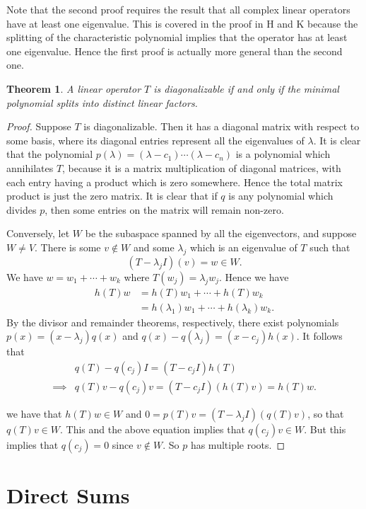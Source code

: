 \documentclass[12pt]{article}
\theoremstyle{plain}
\newtheorem{thm}{Theorem}
\theoremstyle{definition}
\begin{document}
Note that the second proof requires the result that all complex linear operators have at least one eigenvalue. This is covered in the proof in H and K because the splitting of the characteristic polynomial implies that the operator has at least one eigenvalue. Hence the first proof is actually more general than the second one.

\begin{thm}
A linear operator $T$ is diagonalizable if and only if the minimal polynomial splits into distinct linear factors.
\end{thm}
\begin{proof}
Suppose $T$ is diagonalizable. Then it has a diagonal matrix with respect to some basis, where its diagonal entries represent all the eigenvalues of $\lambda$. It is clear that the polynomial $p(\lambda) = (\lambda - c_1)\cdots(\lambda - c_n)$ is a polynomial which annihilates $T$, because it is a matrix multiplication of diagonal matrices, with each entry having a product which is zero somewhere. Hence the total matrix product is just the zero matrix. It is clear that if $q$ is any polynomial which divides $p$, then some entries on the matrix will remain non-zero.

Conversely, let $W$ be the subaspace spanned by all the eigenvectors, and suppose $W \neq V$. There is some $v \not\in W$ and some $\lambda_j$ which is an eigenvalue of $T$ such that 
\[(T - \lambda_j I)(v) = w \in W.\]
We have $w = w_1 + \cdots + w_k$ where $T(w_j) = \lambda_jw_j$. Hence we have
\begin{align*}
h(T)w &= h(T)w_1 + \cdots + h(T)w_k \\
		 &= h(\lambda_1)w_1 + \cdots + h(\lambda_k)w_k.
\end{align*}
By the divisor and remainder theorems, respectively, there exist polynomials $p(x) = (x - \lambda_j)q(x)$ and $q(x) - q(\lambda_j) = (x - c_j)h(x)$. It follows that
\begin{align*}
& q(T) - q(c_j)I = (T - c_jI)h(T) \\
		\implies & q(T)v - q(c_j)v = (T - c_jI)(h(T)v) = h(T)w.
\end{align*}

we have that $h(T)w \in W$ and $0 = p(T)v = (T - \lambda_j I)(q(T)v)$, so that $q(T)v \in W$. This and the above equation implies that $q(c_j)v \in W$. But this implies that $q(c_j) = 0$ since $v \not\in W$. So $p$ has multiple roots.
\end{proof}

\section{Direct Sums}
\end{document}
